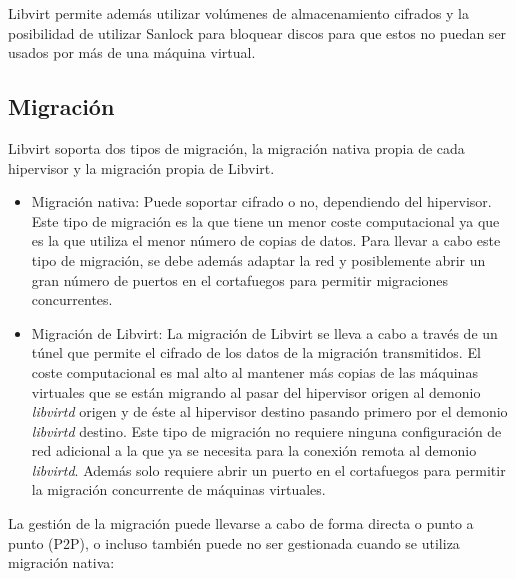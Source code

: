 \documentclass[spanisheDIVcalc,twoside,parskip-,pointlessnumbers,final]{scrbook}
\begin{document}
Libvirt permite además utilizar volúmenes de almacenamiento cifrados
y la posibilidad de utilizar Sanlock para bloquear discos para que
estos no puedan ser usados por más de una máquina virtual. 


\subsection{Migración}

Libvirt soporta dos tipos de migración, la migración nativa propia
de cada hipervisor y la migración propia de Libvirt.
\begin{itemize}
\item Migración nativa: Puede soportar cifrado o no, dependiendo del hipervisor.
Este tipo de migración es la que tiene un menor coste computacional
ya que es la que utiliza el menor número de copias de datos. Para
llevar a cabo este tipo de migración, se debe además adaptar la red
y posiblemente abrir un gran número de puertos en el cortafuegos para
permitir migraciones concurrentes.
\item Migración de Libvirt: La migración de Libvirt se lleva a cabo a través
de un túnel que permite el cifrado de los datos de la migración transmitidos.
El coste computacional es mal alto al mantener más copias de las máquinas
virtuales que se están migrando al pasar del hipervisor origen al
demonio \emph{libvirtd} origen y de éste al hipervisor destino pasando primero
por el demonio \emph{libvirtd} destino. Este tipo de migración no requiere ninguna
configuración de red adicional a la que ya se necesita para la conexión
remota al demonio \emph{libvirtd}. Además solo requiere abrir un puerto
en el cortafuegos para permitir la migración concurrente de máquinas
virtuales.
\end{itemize}
La gestión de la migración puede llevarse a cabo de forma directa
o punto a punto (P2P), o incluso también puede no ser gestionada cuando
se utiliza migración nativa:
\end{document}
